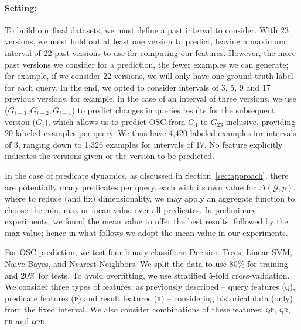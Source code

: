 \documentclass[runningheads]{llncs}
\begin{document}
\paragraph{Setting:} To build our final datasets, we must define a past interval to consider. With 23 versions, we must hold out at least one version to predict, leaving a maximum interval of 22 past versions to use for computing our features. However, the more past versions we consider for a prediction, the fewer examples we can generate; for example, if we consider 22 versions, we will only have one ground truth label for each query. In the end, we opted to consider intervals of 3, 5, 9 and 17 previous versions, for example, in the case of an interval of three versions, we use ($G_{i-3}, G_{i-2}, G_{i-1}$) to predict changes in queries results for the subsequent version ($G_i$), which allows us to predict OSC from $G_4$ to $G_{23}$ inclusive, providing 20 labeled examples per query. We thus have 4,420 labeled examples for intervals of 3, ranging down to 1,326 examples for intervals of 17. No feature explicitly indicates the versions given or the version to be predicted.

In the case of predicate dynamics, as discussed in Section~\ref{sec:approach}, there are potentially many predicates per query, each with its own value for $\Delta(\mathcal{G},p)$, where to reduce (and fix) dimensionality, we may apply an aggregate function to choose the min, max or mean value over all predicates. In preliminary experiments, we found the mean value to offer the best results, followed by the max value; hence in what follows we adopt the mean value in our experiments.

For OSC prediction, we test four binary classifiers: Decision Trees, Linear SVM, Naive Bayes, and Nearest Neighbors. We split the data to use 80\% for training and 20\% for tests. To avoid overfitting, we use stratified 5-fold cross-validation. We consider three types of features, as previously described -- query features (\textsc{q}), predicate features (\textsc{p}) and result features (\textsc{r}) -- considering historical data (only) from the fixed interval. We also consider combinations of these features: \textsc{qp}, \textsc{qr}, \textsc{pr} and \textsc{qpr}.


\end{document}
